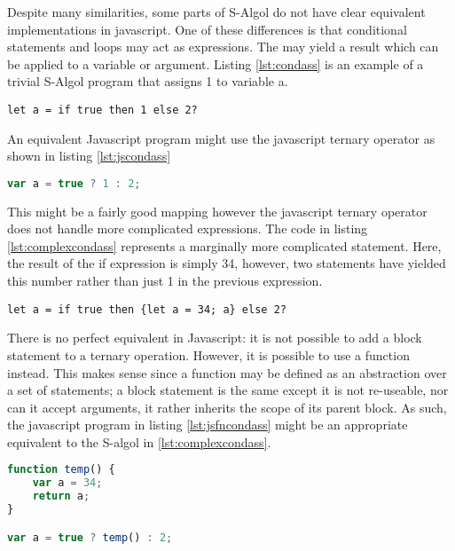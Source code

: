 \documentclass{article}
\begin{document}
Despite many similarities, some parts of S-Algol do not have clear equivalent implementations in javascript. One of these differences is that conditional statements and loops may act as expressions. The may yield a result which can be applied to a variable or argument. Listing \ref{lst:condass} is an example of a trivial S-Algol program that assigns 1 to variable a.

\begin{lstlisting}[caption={S-Algol conditional assignment},label={lst:condass}]
let a = if true then 1 else 2?
\end{lstlisting}

An equivalent Javascript program might use the javascript ternary operator as shown in listing \ref{lst:jscondass}

\begin{lstlisting}[caption={Javascript conditional assignment},label={lst:jscondass}, language=javascript]
var a = true ? 1 : 2;
\end{lstlisting}

This might be a fairly good mapping however the javascript ternary operator does not handle more complicated expressions. The code in listing \ref{lst:complexcondass} represents a marginally more complicated statement. Here, the result of the if expression is simply 34, however, two statements have yielded this number rather than just 1 in the previous expression.

\begin{lstlisting}[caption={More complicated S-Algol conditional assignment},label={lst:complexcondass}]
let a = if true then {let a = 34; a} else 2?
\end{lstlisting}

There is no perfect equivalent in Javascript: it is not possible to add a block statement to a ternary operation. However, it is possible to use a function instead. This makes sense since a function may be defined as an abstraction over a set of statements; a block statement is the same except it is not re-useable, nor can it accept arguments, it rather inherits the scope of its parent block. As such, the javascript program in listing \ref{lst:jsfncondass} might be an appropriate equivalent to the S-algol in \ref{lst:complexcondass}.

\begin{lstlisting}[caption={Javascript conditional assignment using a function},label={lst:jsfncondass}, language=javascript]
function temp() {
    var a = 34;
    return a;
}

var a = true ? temp() : 2;
\end{lstlisting}
\end{document}
